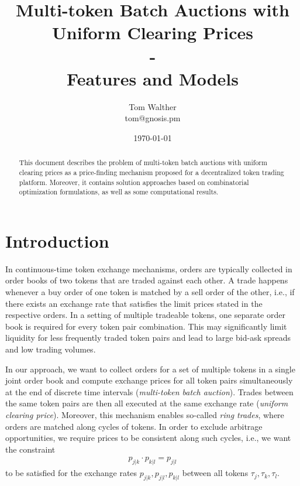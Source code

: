 \documentclass[11pt,parskip=full]{scrartcl}%
\title{
  Multi-token Batch Auctions with Uniform Clearing Prices\\
  - \\
  \Large Features and Models}
\author{Tom Walther \\ tom@gnosis.pm}
\date{\today}
\newcommand*{\ie}{i.e., }
\begin{document}
\maketitle


\begin{abstract}
  This document describes the problem of multi-token batch auctions with uniform clearing prices
  as a price-finding mechanism proposed for a decentralized token trading platform.
  Moreover, it contains solution approaches based on combinatorial optimization formulations,
  as well as some computational results.
\end{abstract}



\tableofcontents

\newpage
\section{Introduction}
\label{sec:introduction}

In continuous-time token exchange mechanisms, orders are typically collected in order books of two
tokens that are traded against each other.
A trade happens whenever a buy order of one token is matched by a sell order of the other, \ie if
there exists an exchange rate that satisfies the limit prices stated in the respective orders.
In a setting of multiple tradeable tokens, one separate order book is required for every token pair
combination.
This may significantly limit liquidity for less frequently traded token pairs and lead to large
bid-ask spreads and low trading volumes.

In our approach, we want to collect orders for a set of multiple tokens in a single joint order
book and compute exchange prices for all token pairs simultaneously at the end of discrete time
intervals (\emph{multi-token batch auction}).
Trades between the same token pairs are then all executed at the same exchange rate (\emph{uniform
clearing price}).
Moreover, this mechanism enables so-called \emph{ring trades}, where orders are matched along
cycles of tokens.
In order to exclude arbitrage opportunities, we require prices to be consistent along such cycles,
\ie we want the constraint
\begin{align}
  p_{j|k} \cdot p_{k|l} = p_{j|l}
  \label{eq:arbitrage_freeness}
\end{align}
to be satisfied for the exchange rates $p_{j|k}, p_{j|l}, p_{k|l}$ between all tokens
$ \tau_j, \tau_k, \tau_l $.
\end{document}

